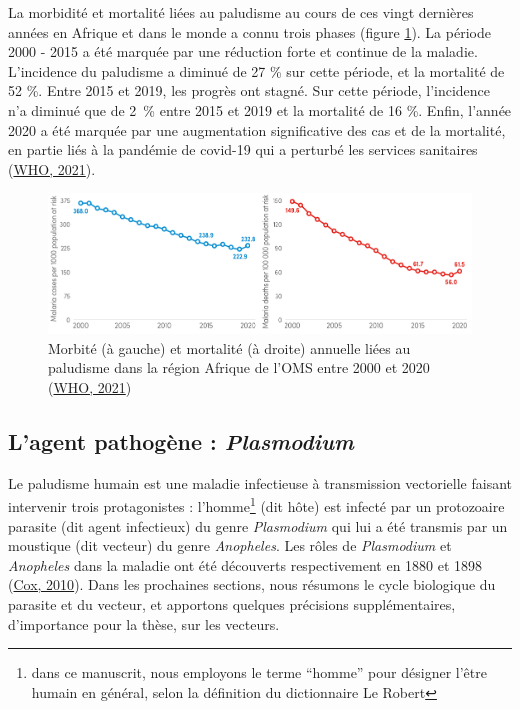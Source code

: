 \documentclass[12pt,twoside]{reedthesis}
\begin{document}
La morbidité et mortalité liées au paludisme au cours de ces vingt dernières années en Afrique et dans le monde a connu trois phases (figure \ref{fig:malaria-african-trends}). La période 2000 - 2015 a été marquée par une réduction forte et continue de la maladie. L'incidence du paludisme a diminué de 27 \% sur cette période, et la mortalité de 52 \%. Entre 2015 et 2019, les progrès ont stagné. Sur cette période, l'incidence n'a diminué que de 2~\% entre 2015 et 2019 et la mortalité de 16 \%. Enfin, l'année 2020 a été marquée par une augmentation significative des cas et de la mortalité, en partie liés à la pandémie de covid-19 qui a perturbé les services sanitaires (\protect\hyperlink{ref-who_2021}{WHO, 2021}).\\
\begin{figure}

{\centering \includegraphics[width=1\linewidth]{figure/malaria_africa_trends} 

}

\caption[Morbité et mortalité annuelle liées au paludisme dans la région Afrique de l'OMS entre 2000 et 2020]{Morbité (à gauche) et mortalité (à droite) annuelle liées au paludisme dans la région Afrique de l'OMS entre 2000 et 2020 (\protect\hyperlink{ref-who_2021}{WHO, 2021})}\label{fig:malaria-african-trends}
\end{figure}
\hypertarget{lagent-pathoguxe8ne-plasmodium}{%
\subsection{\texorpdfstring{L'agent pathogène : \emph{Plasmodium}}{L'agent pathogène : Plasmodium}}\label{lagent-pathoguxe8ne-plasmodium}}

Le paludisme humain est une maladie infectieuse à transmission vectorielle faisant intervenir trois protagonistes : l'homme\footnote{dans ce manuscrit, nous employons le terme ``homme'' pour désigner l'être humain en général, selon la définition du dictionnaire Le Robert} (dit hôte) est infecté par un protozoaire parasite (dit agent infectieux) du genre \emph{Plasmodium} qui lui a été transmis par un moustique (dit vecteur) du genre \emph{Anopheles}. Les rôles de \emph{Plasmodium} et \emph{Anopheles} dans la maladie ont été découverts respectivement en 1880 et 1898 (\protect\hyperlink{ref-cox_history_2010}{Cox, 2010}). Dans les prochaines sections, nous résumons le cycle biologique du parasite et du vecteur, et apportons quelques précisions supplémentaires, d'importance pour la thèse, sur les vecteurs.\\
\end{document}
